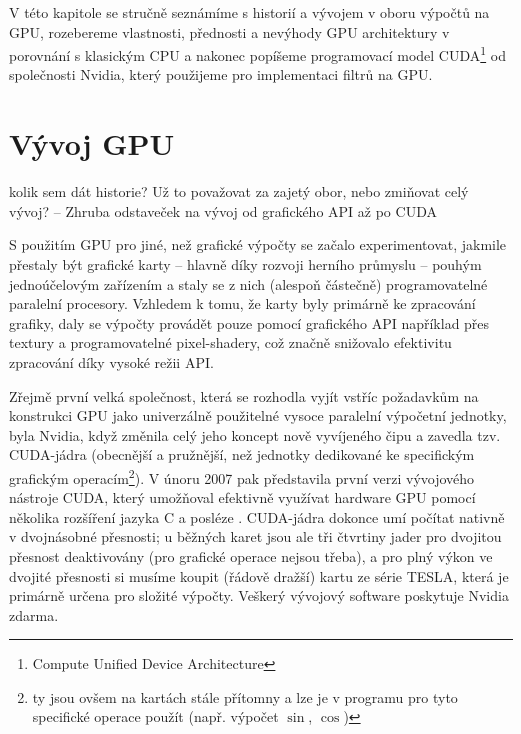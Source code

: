 






V této kapitole se stručně seznámíme s historií a vývojem v oboru výpočtů na GPU, rozebereme vlastnosti, přednosti a nevýhody GPU architektury v porovnání s klasickým CPU a nakonec popíšeme programovací model CUDA\footnote{Compute Unified Device Architecture} od společnosti Nvidia, který použijeme pro implementaci filtrů na GPU.

\section{Vývoj GPU}

    kolik sem dát historie? Už to považovat za zajetý obor, nebo zmiňovat celý vývoj? -- Zhruba odstaveček na vývoj od grafického API až po CUDA

    S použitím GPU pro jiné, než grafické výpočty se začalo experimentovat, jakmile přestaly být grafické karty -- hlavně díky rozvoji herního průmyslu -- pouhým jednoúčelovým zařízením a staly se z nich (alespoň částečně) programovatelné paralelní procesory. Vzhledem k tomu, že karty byly primárně ke zpracování grafiky, daly se výpočty provádět pouze pomocí grafického API například přes textury a programovatelné pixel-shadery, což značně snižovalo efektivitu zpracování díky vysoké režii API.

    Zřejmě první velká společnost, která se rozhodla vyjít vstříc požadavkům na konstrukci GPU jako univerzálně použitelné vysoce paralelní výpočetní jednotky, byla Nvidia, když změnila celý jeho koncept nově vyvíjeného čipu a zavedla tzv. CUDA-jádra (obecnější a pružnější, než jednotky dedikované ke specifickým grafickým operacím\footnote{ty jsou ovšem na kartách stále přítomny a lze je v programu pro tyto specifické operace použít (např. výpočet $\sin$, $\cos$)}). V únoru 2007 pak představila první verzi vývojového nástroje CUDA, který umožňoval efektivně využívat hardware GPU pomocí několika rozšíření jazyka C a posléze \Cpp. CUDA-jádra dokonce umí počítat nativně v dvojnásobné přesnosti; u běžných karet jsou ale tři čtvrtiny jader pro dvojitou přesnost deaktivovány \cite{Heller} (pro grafické operace nejsou třeba), a pro plný výkon ve dvojité přesnosti si musíme koupit (řádově dražší) kartu ze série TESLA, která je primárně určena pro složité výpočty. Veškerý vývojový software poskytuje Nvidia zdarma.

